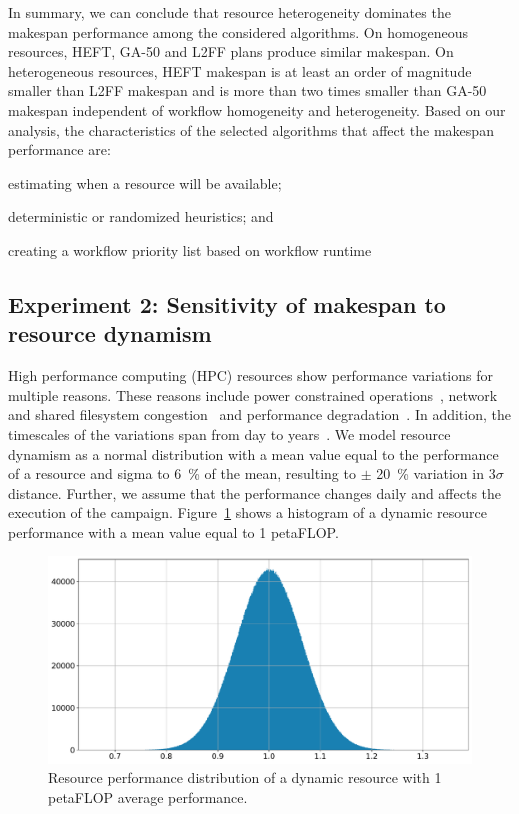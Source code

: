 In summary, we can conclude that resource heterogeneity dominates the makespan performance among the considered algorithms.
On homogeneous resources, HEFT, GA-50 and L2FF plans produce similar makespan.
On heterogeneous resources, HEFT makespan is at least an order of magnitude smaller than L2FF makespan and is more than two times smaller than GA-50 makespan independent of workflow homogeneity and heterogeneity.
Based on our analysis, the characteristics of the selected algorithms that affect the makespan performance are:
\begin{inparaenum}[1)]
    \item estimating when a resource will be available;
    \item deterministic or randomized heuristics; and
    \item creating a workflow priority list based on workflow runtime
\end{inparaenum}

\subsection{Experiment 2: Sensitivity of makespan to resource dynamism}

High performance computing (HPC) resources show performance variations for multiple reasons.
These reasons include power constrained operations~\cite{inadomi2015analyzing}, network and shared filesystem congestion~\cite{brown2018interference} and performance degradation~\cite{wu2017survey}.
In addition, the timescales of the variations span from day to years~\cite{skinner2005understanding}.
We model resource dynamism as a normal distribution with a mean value equal to the performance of a resource and sigma to 6~\% of the mean, resulting to $\pm$ 20~\% variation in $3\sigma$ distance.
Further, we assume that the performance changes daily and affects the execution of the campaign.
Figure~\ref{fig:dynamic_res} shows a histogram of a dynamic resource performance with a mean value equal to 1 petaFLOP.

\begin{figure}[ht!]
    \centering
    \includegraphics[width=.95\textwidth]{figures/campaign/DynRes.pdf}
    \caption{Resource performance distribution of a dynamic resource with 1 petaFLOP average performance.}
    \label{fig:dynamic_res}
\end{figure}

